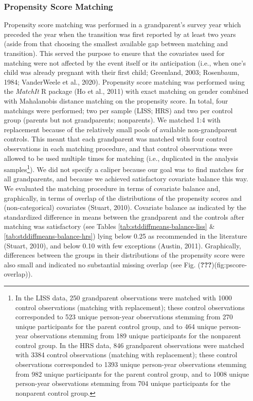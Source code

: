 \documentclass[
  english,
  man, noextraspace]{apa7}
\begin{document}
\hypertarget{propensity-score-matching}{%
\subsubsection{Propensity Score Matching}\label{propensity-score-matching}}

Propensity score matching was performed in a grandparent's survey year which preceded the year when the transition was first reported by at least two years (aside from that choosing the smallest available gap between matching and transition). This served the purpose to ensure that the covariates used for matching were not affected by the event itself or its anticipation (i.e., when one's child was already pregnant with their first child; Greenland, 2003; Rosenbaum, 1984; VanderWeele et al., 2020). Propensity score matching was performed using the \emph{MatchIt} R package (Ho et al., 2011) with exact matching on gender combined with Mahalanobis distance matching on the propensity score. In total, four matchings were performed; two per sample (LISS; HRS) and two per control group (parents but not grandparents; nonparents). We matched 1:4 with replacement because of the relatively small pools of available non-grandparent controls. This meant that each grandparent was matched with four control observations in each matching procedure, and that control observations were allowed to be used multiple times for matching (i.e., duplicated in the analysis samples\footnote{In the LISS data, 250 grandparent observations were matched with 1000 control observations (matching with replacement); these control observations corresponded to 523 unique person-year observations stemming from 270 unique participants for the parent control group, and to 464 unique person-year observations stemming from 189 unique participants for the nonparent control group. In the HRS data, 846 grandparent observations were matched with 3384 control observations (matching with replacement); these control observations corresponded to 1393 unique person-year observations stemming from 982 unique participants for the parent control group, and to 1008 unique person-year observations stemming from 704 unique participants for the nonparent control group.}). We did not specify a caliper because our goal was to find matches for all grandparents, and because we achieved satisfactory covariate balance this way.\\
We evaluated the matching procedure in terms of covariate balance and, graphically, in terms of overlap of the distributions of the propensity scores and (non-categorical) covariates (Stuart, 2010). Covariate balance as indicated by the standardized difference in means between the grandparent and the controls after matching was satisfactory (see Tables \ref{tab:stddiffmeans-balance-liss} \& \ref{tab:stddiffmeans-balance-hrs}) lying below 0.25 as recommended in the literature (Stuart, 2010), and below 0.10 with few exceptions (Austin, 2011). Graphically, differences between the groups in their distributions of the propensity score were also small and indicated no substantial missing overlap (see Fig. ({\textbf{???}})(fig:pscore-overlap)).\\
\end{document}

